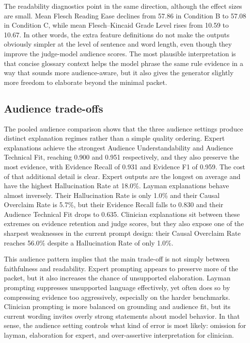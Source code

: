 \documentclass[sigconf,nonacm]{acmart}
\begin{document}
The readability diagnostics point in the same direction, although the effect sizes are small. Mean Flesch Reading Ease declines from 57.86 in Condition B to 57.08 in Condition C, while mean Flesch--Kincaid Grade Level rises from 10.59 to 10.67. In other words, the extra feature definitions do not make the outputs obviously simpler at the level of sentence and word length, even though they improve the judge-model audience scores. The most plausible interpretation is that concise glossary context helps the model phrase the same rule evidence in a way that sounds more audience-aware, but it also gives the generator slightly more freedom to elaborate beyond the minimal packet.

\subsection{Audience trade-offs}
The pooled audience comparison shows that the three audience settings produce distinct explanation regimes rather than a simple quality ordering. Expert explanations achieve the strongest Audience Understandability and Audience Technical Fit, reaching 0.900 and 0.951 respectively, and they also preserve the most evidence, with Evidence Recall of 0.931 and Evidence F1 of 0.959. The cost of that additional detail is clear. Expert outputs are the longest on average and have the highest Hallucination Rate at 18.0\%. Layman explanations behave almost inversely. Their Hallucination Rate is only 1.0\% and their Causal Overclaim Rate is 5.7\%, but their Evidence Recall falls to 0.830 and their Audience Technical Fit drops to 0.635. Clinician explanations sit between these extremes on evidence retention and judge scores, but they also expose one of the sharpest weaknesses in the current prompt design: their Causal Overclaim Rate reaches 56.0\% despite a Hallucination Rate of only 1.0\%.

This audience pattern implies that the main trade-off is not simply between faithfulness and readability. Expert prompting appears to preserve more of the packet, but it also increases the chance of unsupported elaboration. Layman prompting suppresses unsupported language effectively, yet often does so by compressing evidence too aggressively, especially on the harder benchmarks. Clinician prompting is more balanced on grounding and audience fit, but its current wording invites overly strong statements about model behavior. In that sense, the audience setting controls what kind of error is most likely: omission for layman, elaboration for expert, and over-assertive interpretation for clinician.
\end{document}
